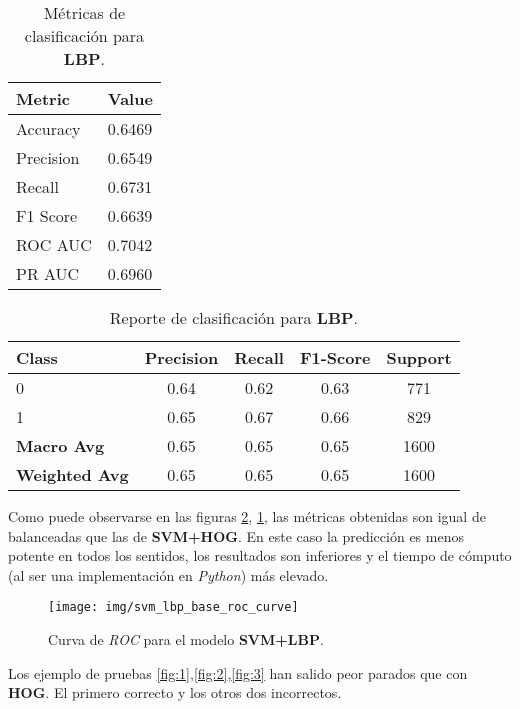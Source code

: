 \documentclass[12pt,letterpaper]{article}
\begin{document}
\begin{table}[htp]
    \centering
    \begin{tabular}{ll}
    \hline
    \textbf{Metric} & \textbf{Value} \\
    \hline
    Accuracy    & 0.6469 \\
    Precision   & 0.6549 \\
    Recall      & 0.6731 \\
    F1 Score    & 0.6639 \\
    ROC AUC     & 0.7042 \\
    PR AUC      & 0.6960 \\
    \hline
    \end{tabular}
    \caption{Métricas de clasificación para \textbf{LBP}.}
    \label{tab:classification_metrics_lbp}
\end{table}

\begin{table}[htp]
    \centering
    \begin{tabular}{lcccc}
    \hline
    \textbf{Class} & \textbf{Precision} & \textbf{Recall} & \textbf{F1-Score} & \textbf{Support} \\
    \hline
    0 & 0.64 & 0.62 & 0.63 & 771 \\
    1 & 0.65 & 0.67 & 0.66 & 829 \\
    \hline
    \textbf{Macro Avg} & 0.65 & 0.65 & 0.65 & 1600 \\
    \textbf{Weighted Avg} & 0.65 & 0.65 & 0.65 & 1600 \\
    \hline
    \end{tabular}
    \caption{Reporte de clasificación para \textbf{LBP}.}
    \label{tab:classification_report_lbp}
\end{table}

Como puede observarse en las figuras \ref{tab:classification_report_lbp}, \ref{tab:classification_metrics_lbp}, las métricas obtenidas son igual de balanceadas que las de \textbf{SVM+HOG}. En este caso la predicción es menos potente en todos los sentidos, los resultados son inferiores y el tiempo de cómputo (al ser una implementación en \textit{Python}) más elevado.

\begin{figure}[htp]
    \centering
    \texttt{[image: img/svm\_lbp\_base\_roc\_curve]}
    \caption{Curva de \textit{ROC} para el modelo \textbf{SVM+LBP}.}
    \label{fig:roc_lbp}
\end{figure}

Los ejemplo de pruebas \ref{fig:1},\ref{fig:2},\ref{fig:3} han salido peor parados que con \textbf{HOG}. El primero correcto y los otros dos incorrectos.
\end{document}
